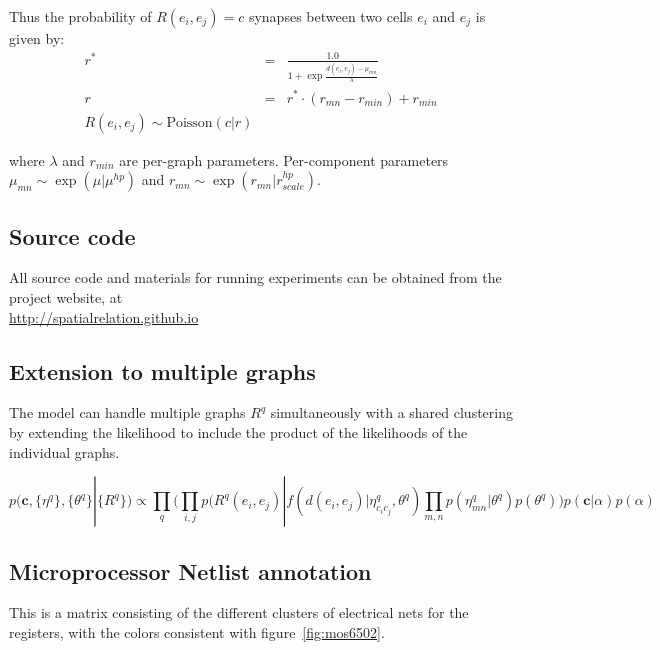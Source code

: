 \documentclass{article}
\renewcommand{\vec}[1]{\mathbf{#1}}
\begin{document}
Thus the probability of $R(e_i, e_j) = c$ synapses between two cells $e_i$ and $e_j$ is given by:
\begin{eqnarray}
r^* &=& \frac{1.0}{1 + \exp \frac{d(e_i, e_j) - \mu_{mn}}{\lambda}}\\
r & = & r^* \cdot (r_{mn} - r_{min}) + r_{min} \\
R(e_i, e_j) \sim \textrm{Poisson}(c | r)
\end{eqnarray}

where $\lambda$ and $r_{min}$ are per-graph parameters. Per-component parameters $\mu_{mn} \sim \exp(\mu | \mu^{hp})$ and $r_{mn} \sim \exp(r_{mn} | r_{scale}^{hp})$. 

\subsection{Source code}

All source code and materials for running experiments can be
obtained from the project website, at \\

\href{http://spatialrelation.github.io }{http://spatialrelation.github.io}


\subsection{Extension to multiple graphs}
\label{supp:multigraph}
The model can handle multiple graphs $R^q$ simultaneously with a shared clustering by extending the likelihood to include the product of the likelihoods of the individual graphs. 

\begin{equation}
  p(\vec{c}, \{\eta^q\}, \{\theta^q\} | \{R^q\} ) \propto \prod_q \Bigg(\prod_{i, j} p(R^q(e_i, e_j) | f(d(e_i, e_j) | \eta^q_{c_ic_j}, \theta^q) \prod_{m, n} p(\eta^q_{mn} | \theta^q)  p(\theta^q) \Bigg) p(\vec{c} | \alpha) p(\alpha) 
\end{equation}

\FloatBarrier

\subsection{Microprocessor Netlist annotation}
\label{supp:mos6502netlist}
This is a matrix consisting of the different clusters of electrical nets for 
the registers, with the colors consistent with figure~\ref{fig:mos6502}. 


\end{document}
